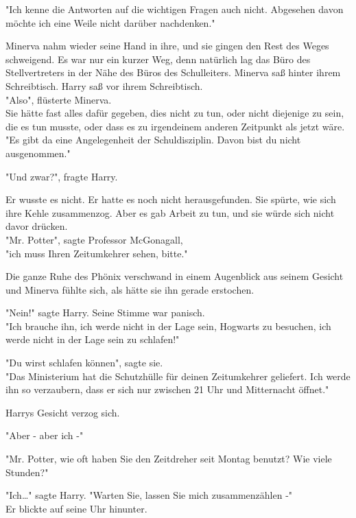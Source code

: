 {"Ich kenne die Antworten auf die wichtigen Fragen auch nicht. Abgesehen davon möchte ich eine Weile nicht darüber nachdenken."

Minerva nahm wieder seine Hand in ihre, und sie gingen den Rest des Weges schweigend. Es war nur ein kurzer Weg, denn natürlich lag das Büro des Stellvertreters in der Nähe des Büros des Schulleiters. Minerva saß hinter ihrem Schreibtisch. Harry saß vor ihrem Schreibtisch.\\ "Also", flüsterte Minerva.\\ Sie hätte fast alles dafür gegeben, dies nicht zu tun, oder nicht diejenige zu sein, die es tun musste, oder dass es zu irgendeinem anderen Zeitpunkt als jetzt wäre.\\ "Es gibt da eine Angelegenheit der Schuldisziplin. Davon bist du nicht ausgenommen."

"Und zwar?", fragte Harry.

Er wusste es nicht. Er hatte es noch nicht herausgefunden. Sie spürte, wie sich ihre Kehle zusammenzog. Aber es gab Arbeit zu tun, und sie würde sich nicht davor drücken.\\ "Mr. Potter", sagte Professor McGonagall,\\ "ich muss Ihren Zeitumkehrer sehen, bitte."

Die ganze Ruhe des Phönix verschwand in einem Augenblick aus seinem Gesicht und Minerva fühlte sich, als hätte sie ihn gerade erstochen.

"Nein!" sagte Harry. Seine Stimme war panisch.\\ "Ich brauche ihn, ich werde nicht in der Lage sein, Hogwarts zu besuchen, ich werde nicht in der Lage sein zu schlafen!"

"Du wirst schlafen können", sagte sie.\\ "Das Ministerium hat die Schutzhülle für deinen Zeitumkehrer geliefert. Ich werde ihn so verzaubern, dass er sich nur zwischen 21 Uhr und Mitternacht öffnet."

Harrys Gesicht verzog sich.

"Aber - aber ich -"

"Mr. Potter, wie oft haben Sie den Zeitdreher seit Montag benutzt? Wie viele Stunden?"

"Ich…" sagte Harry. "Warten Sie, lassen Sie mich zusammenzählen -"\\ Er blickte auf seine Uhr hinunter.

}
